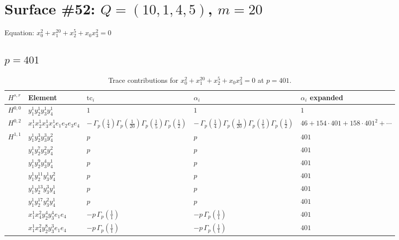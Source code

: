\documentclass[11pt]{article}
\begin{document}
\newpage

\section*{Surface \#52: $Q=(10, 1, 4, 5)$, $m=20$}

Equation: $x_0^{2} + x_1^{20} + x_2^{5} + x_0 x_3^{2} = 0$

\subsection*{$p = 401$}

\begin{table}[ht]
\centering
\caption{Trace contributions for $x_0^{2} + x_1^{20} + x_2^{5} + x_0 x_3^{2} = 0$ at $p=401$.}\label{tab:deformed-52}
\renewcommand{\arraystretch}{1.1}
{\scriptsize
\begin{tabular}{@{}lllll@{}}
\toprule
$H^{s,r}$ & Element & $\mathrm{tc}_i$ & $\alpha_i$ & $\alpha_i$ expanded \\
\midrule
$H^{0,0}$ & $y_{1}^{1} y_{2}^{1} y_{3}^{1} y_{4}^{1}$ & $1$ & $1$ & $1$ \\
\midrule
$H^{0,2}$ & $x_{1}^{1} x_{2}^{1} x_{3}^{1} x_{4}^{1}  e_{1} e_{2} e_{3} e_{4}$ & $- \, \Gamma_p \left( \frac{1}{4} \right) \Gamma_p \left( \frac{1}{20} \right) \Gamma_p \left( \frac{1}{5} \right) \Gamma_p \left( \frac{1}{2} \right)$ & $- \, \Gamma_p \left( \frac{1}{4} \right) \Gamma_p \left( \frac{1}{20} \right) \Gamma_p \left( \frac{1}{5} \right) \Gamma_p \left( \frac{1}{2} \right)$ & $46{+}154{\cdot}401{+}158{\cdot}401^{2}{+}\cdots$ \\
\midrule
$H^{1,1}$ & $y_{1}^{1} y_{2}^{3} y_{3}^{3} y_{4}^{2}$ & $p \,$ & $p \,$ & $401$ \\
 & $y_{1}^{1} y_{2}^{7} y_{3}^{2} y_{4}^{2}$ & $p \,$ & $p \,$ & $401$ \\
 & $y_{1}^{1} y_{2}^{9} y_{3}^{4} y_{4}^{1}$ & $p \,$ & $p \,$ & $401$ \\
 & $y_{1}^{1} y_{2}^{11} y_{3}^{1} y_{4}^{2}$ & $p \,$ & $p \,$ & $401$ \\
 & $y_{1}^{1} y_{2}^{13} y_{3}^{3} y_{4}^{1}$ & $p \,$ & $p \,$ & $401$ \\
 & $y_{1}^{1} y_{2}^{17} y_{3}^{2} y_{4}^{1}$ & $p \,$ & $p \,$ & $401$ \\
 & $x_{1}^{1} x_{4}^{2} y_{2}^{4} y_{3}^{4} e_{1} e_{4}$ & $- p \, \Gamma_p \left( \frac{1}{1} \right)$ & $- p \, \Gamma_p \left( \frac{1}{1} \right)$ & $401$ \\
 & $x_{1}^{1} x_{4}^{2} y_{2}^{8} y_{3}^{3} e_{1} e_{4}$ & $- p \, \Gamma_p \left( \frac{1}{1} \right)$ & $- p \, \Gamma_p \left( \frac{1}{1} \right)$ & $401$ \\

\end{tabular}}
\end{table}
\end{document}
